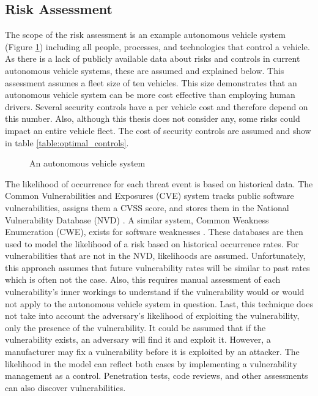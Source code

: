 \documentclass{article}
\begin{document}
\subsection{Risk Assessment}

The scope of the risk assessment is an example autonomous vehicle system (Figure \ref{autonomous_vehicle_system}) including all people, processes, and technologies that control a vehicle. As there is a lack of publicly available data about risks and controls in current autonomous vehicle systems, these are assumed and explained below. This assessment assumes a fleet size of ten vehicles. This size demonstrates that an autonomous vehicle system can be more cost effective than employing human drivers. Several security controls have a per vehicle cost and therefore depend on this number. Also, although this thesis does not consider any, some risks could impact an entire vehicle fleet. The cost of security controls are assumed and show in table \ref{table:optimal_controls}. 

\begin{figure}[p] \centering
    \def\svgwidth{\textwidth}
    
    \caption{An autonomous vehicle system}
    \label{autonomous_vehicle_system}
\end{figure}

The likelihood of occurrence for each threat event is based on historical data.  The Common Vulnerabilities and Exposures (CVE) \citep{the_mitre_corporation_common_2018} system tracks public software vulnerabilities, assigns them a CVSS score, and stores them in the National Vulnerability Database (NVD) \citep{national_institute_of_standards_and_technology_national_}. A similar system, Common Weakness Enumeration (CWE), exists for software weaknesses \citep{the_mitre_corporation_common_2018-1}. These databases are then used to model the likelihood of a risk based on historical occurrence rates. For vulnerabilities that are not in the NVD, likelihoods are assumed. Unfortunately, this approach assumes that future vulnerability rates will be similar to past rates which is often not the case. Also, this requires manual assessment of each vulnerability's inner workings to understand if the vulnerability would or would not apply to the autonomous vehicle system in question. Last, this technique does not take into account the adversary's likelihood of exploiting the vulnerability, only the presence of the vulnerability. It could be assumed that if the vulnerability exists, an adversary will find it and exploit it. However, a manufacturer may fix a vulnerability before it is exploited by an attacker. The likelihood in the model can reflect both cases by implementing a vulnerability management as a control. Penetration tests, code reviews, and other assessments can also discover vulnerabilities.
\end{document}
